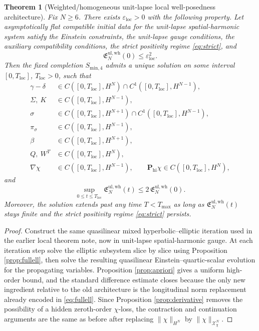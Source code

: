\documentclass[11pt]{article}
\newtheorem{theorem}{Theorem}
\begin{document}
\begin{theorem}[Weighted/homogeneous unit-lapse local well-posedness architecture]
\label{thm:local}
Fix \(N\ge 6\). There exists \(\varepsilon_{\mathrm{loc}}>0\) with the following property. Let asymptotically flat compatible initial data for the unit-lapse spatial-harmonic system satisfy the Einstein constraints, the unit-lapse gauge conditions, the auxiliary compatibility conditions, the strict positivity regime \eqref{eq:strict}, and
\begin{equation}
\mathfrak E_N^{\mathrm{ul,wh}}(0)\le \varepsilon_{\mathrm{loc}}^2.
\label{eq:smalllocal}
\end{equation}
Then the fixed completion \(S_{\mathrm{min},4}\) admits a unique solution on some interval \([0,T_{\mathrm{loc}}]\), \(T_{\mathrm{loc}}>0\), such that
\begin{align}
\gamma-\delta &\in C([0,T_{\mathrm{loc}}],H^N)\cap C^1([0,T_{\mathrm{loc}}],H^{N-1}),
\label{eq:reggamma}
\\
\Sigma,\ K &\in C([0,T_{\mathrm{loc}}],H^{N-1}),
\label{eq:regSigma}
\\
\sigma &\in C([0,T_{\mathrm{loc}}],H^{N+1})\cap C^1([0,T_{\mathrm{loc}}],H^{N-1}),
\label{eq:regsigma}
\\
\pi_\sigma &\in C([0,T_{\mathrm{loc}}],H^{N-1}),
\label{eq:regpi}
\\
\beta &\in C([0,T_{\mathrm{loc}}],H^{N+1}),
\label{eq:regbeta}
\\
Q,\ W^T &\in C([0,T_{\mathrm{loc}}],H^N),
\label{eq:regaux}
\\
\nabla\chi &\in C([0,T_{\mathrm{loc}}],H^{N-1}),
\qquad
\mathbf P_{\mathrm{hi}}\chi \in C([0,T_{\mathrm{loc}}],H^N),
\label{eq:regchi}
\end{align}
and
\begin{equation}
\sup_{0\le t\le T_{\mathrm{loc}}}
\mathfrak E_N^{\mathrm{ul,wh}}(t)
\le
2\,\mathfrak E_N^{\mathrm{ul,wh}}(0).
\label{eq:localbound}
\end{equation}
Moreover, the solution extends past any time \(T<T_{\max}\) as long as \(\mathfrak E_N^{\mathrm{ul,wh}}(t)\) stays finite and the strict positivity regime \eqref{eq:strict} persists.
\end{theorem}

\begin{proof}
Construct the same quasilinear mixed hyperbolic--elliptic iteration used in the earlier local theorem note, now in unit-lapse spatial-harmonic gauge. At each iteration step solve the elliptic subsystem slice by slice using Proposition \ref{prop:fullell}, then solve the resulting quasilinear Einstein--quartic-scalar evolution for the propagating variables. Proposition \ref{prop:apriori} gives a uniform high-order bound, and the standard difference estimate closes because the only new ingredient relative to the old architecture is the longitudinal norm replacement already encoded in \eqref{eq:fullell}. Since Proposition \ref{prop:derivative} removes the possibility of a hidden zeroth-order \(\chi\)-loss, the contraction and continuation arguments are the same as before after replacing \(\|\chi\|_{H^N}\) by \(\|\chi\|_{\mathcal X_\chi^N}\).
\end{proof}
\end{document}
